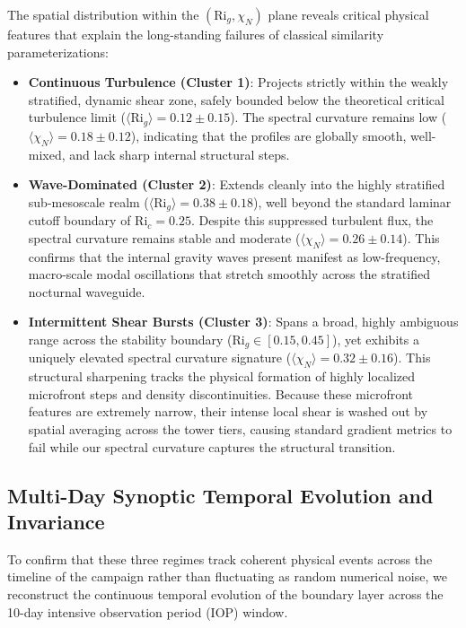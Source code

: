 The spatial distribution within the $(\mathrm{Ri}_g, \chi_N)$ plane reveals critical physical features that explain the long-standing failures of classical similarity parameterizations:
\begin{itemize}
  \item \textbf{Continuous Turbulence (Cluster 1)}: Projects strictly within the weakly stratified, dynamic shear zone, safely bounded below the theoretical critical turbulence limit ($\langle \mathrm{Ri}_g \rangle = 0.12 \pm 0.15$). The spectral curvature remains low ($\langle \chi_N \rangle = 0.18 \pm 0.12$), indicating that the profiles are globally smooth, well-mixed, and lack sharp internal structural steps.
  
  \item \textbf{Wave-Dominated (Cluster 2)}: Extends cleanly into the highly stratified sub-mesoscale realm ($\langle \mathrm{Ri}_g \rangle = 0.38 \pm 0.18$), well beyond the standard laminar cutoff boundary of $\mathrm{Ri}_c = 0.25$. Despite this suppressed turbulent flux, the spectral curvature remains stable and moderate ($\langle \chi_N \rangle = 0.26 \pm 0.14$). This confirms that the internal gravity waves present manifest as low-frequency, macro-scale modal oscillations that stretch smoothly across the stratified nocturnal waveguide.
  
  \item \textbf{Intermittent Shear Bursts (Cluster 3)}: Spans a broad, highly ambiguous range across the stability boundary ($\mathrm{Ri}_g \in [0.15, 0.45]$), yet exhibits a uniquely elevated spectral curvature signature ($\langle \chi_N \rangle = 0.32 \pm 0.16$). This structural sharpening tracks the physical formation of highly localized microfront steps and density discontinuities. Because these microfront features are extremely narrow, their intense local shear is washed out by spatial averaging across the tower tiers, causing standard gradient metrics to fail while our spectral curvature captures the structural transition.
\end{itemize}

\subsection{Multi-Day Synoptic Temporal Evolution and Invariance}
\label{sec:results:synoptic}

To confirm that these three regimes track coherent physical events across the timeline of the campaign rather than fluctuating as random numerical noise, we reconstruct the continuous temporal evolution of the boundary layer across the 10-day intensive observation period (IOP) window.




